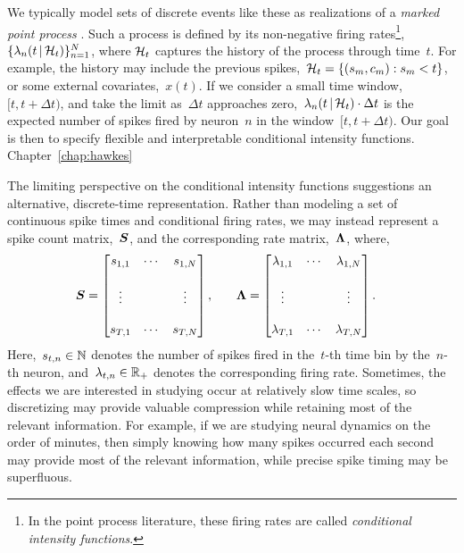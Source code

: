 We typically model sets of discrete events like these as realizations
of a \emph{marked point process} \cite{daley2003introduction1}. Such a
process is defined by its non-negative firing rates\footnote{In the
  point process literature, these firing rates are called
  \emph{conditional intensity functions}.},
${\{\lambda_n(t \,|\, \mathcal{H}_t)\}_{n=1}^N}$, where $\mathcal{H}_t$ captures
the history of the process through time~$t$. For example, the history
may include the previous spikes,~${\mathcal{H}_t = \{(s_m, c_m): s_m < t\}}$,
or some external covariates,~$x(t)$.  If we consider a small time
window,~${[t, t+\Delta t)}$, and take the limit as~$\Delta t$
approaches zero,~${\lambda_n(t \,|\, \mathcal{H}_t) \cdot \Delta t}$ is the
expected number of spikes fired by neuron~$n$ in the
window~${[t, t+\Delta t)}$. Our goal is then to specify flexible and
interpretable conditional intensity
functions. Chapter~\ref{chap:hawkes}

The limiting perspective on the conditional intensity functions
suggestions an alternative, discrete-time representation.  Rather than
modeling a set of continuous spike times and conditional firing rates,
we may instead represent a spike count matrix,~$\boldsymbol{S}$, and the
corresponding rate matrix,~$\boldsymbol{\Lambda}$, where,
\begin{align}
  \boldsymbol{S} &= 
        \begin{bmatrix}
          s_{1,1} & \cdots & s_{1,N} \\
          & & \\
          \vdots  &        & \vdots  \\ 
          & & \\
          s_{T,1} & \cdots & s_{T,N}
        \end{bmatrix}, 
  & & &
  \boldsymbol{\Lambda} &= 
        \begin{bmatrix}
          \lambda_{1,1} & \cdots & \lambda_{1,N} \\
          & & \\
          \vdots  &        & \vdots  \\ 
          & & \\
          \lambda_{T,1} & \cdots & \lambda_{T,N}
        \end{bmatrix}.
\end{align}
Here,~$s_{t,n} \in \mathbb{N}$ denotes the number of spikes fired in
the~$t$-th time bin by the~$n$-th neuron, and~${\lambda_{t,n} \in \mathbb{R}_+}$ denotes 
the corresponding firing rate. Sometimes, the effects we
are interested in studying occur at relatively slow time scales, so
discretizing may provide valuable compression while retaining most of
the relevant information. For example, if we are studying neural
dynamics on the order of minutes, then simply knowing how many spikes
occurred each second may provide most of the relevant information, while
precise spike timing may be superfluous.

